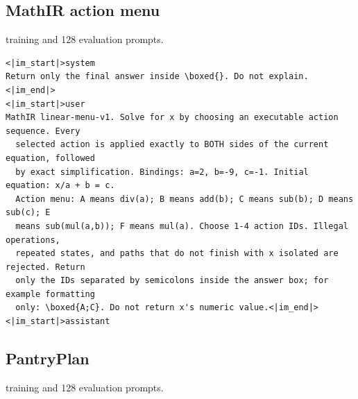 \documentclass{article}
\newcommand{\1}{\mathbf 1}
\theoremstyle{remark}
\theoremstyle{definition}
\theoremstyle{plain}
\begin{document}
\filbreak
\subsection{MathIR action menu}
\label{app:prompt-mathir}

 training and 128 evaluation prompts.

\begin{Verbatim}[fontsize=\scriptsize,frame=single,framesep=4pt,rulecolor=\color{black!25},samepage=true]
<|im_start|>system
Return only the final answer inside \boxed{}. Do not explain.<|im_end|>
<|im_start|>user
MathIR linear-menu-v1. Solve for x by choosing an executable action sequence. Every
  selected action is applied exactly to BOTH sides of the current equation, followed
  by exact simplification. Bindings: a=2, b=-9, c=-1. Initial equation: x/a + b = c.
  Action menu: A means div(a); B means add(b); C means sub(b); D means sub(c); E
  means sub(mul(a,b)); F means mul(a). Choose 1-4 action IDs. Illegal operations,
  repeated states, and paths that do not finish with x isolated are rejected. Return
  only the IDs separated by semicolons inside the answer box; for example formatting
  only: \boxed{A;C}. Do not return x's numeric value.<|im_end|>
<|im_start|>assistant
\end{Verbatim}

\subsection{PantryPlan}
\label{app:prompt-pantry}

 training and 128 evaluation prompts.
\end{document}
